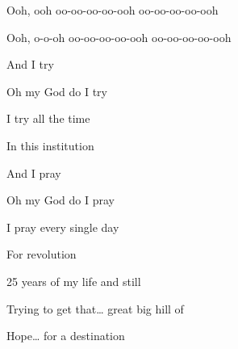 \begin{song}
\bigskip

 Ooh, ooh  oo-oo-oo-oo-ooh  oo-oo-oo-oo-ooh  \par
{} Ooh, o-o-oh  oo-oo-oo-oo-ooh  oo-oo-oo-oo-ooh  \par

\bigskip

And I try \par
Oh my God do I try \par
I try all the time \par
In this institution \par

\bigskip

And I pray \par
Oh my God do I pray \par
I pray every single day \par
For revolution \par

\bigskip

\Chorus

\bigskip

25 years of my life and still \par
{}Trying to get that… great big hill of \par
{}Hope… for a destination \par

\bigskip

\end{song}
